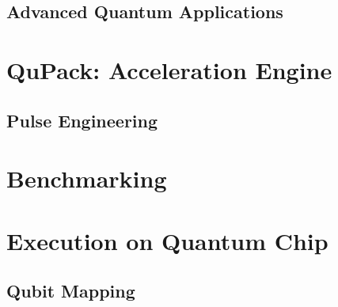 \documentclass[pra,twocolumn,superscriptaddress,floatfix,nofootinbib,amsmath,amssymb]{revtex4-1}
\begin{document}
\subsection{Advanced Quantum Applications}



\section{QuPack: Acceleration Engine}
% 

% 

% 

% 

\subsection{Pulse Engineering}



\section{Benchmarking}
\label{sec:benchmark}



\section{Execution on Quantum Chip}

% 

\subsection{Qubit Mapping}


% 

% 


% 


\end{document}
